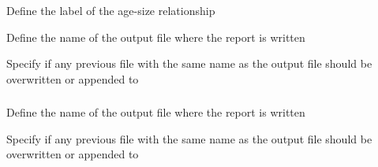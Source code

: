 \subsubsection[Print mean weight at age]{}

 {Define the label of the age-size relationship}

 {Define the name of the output file where the report is written}

 {Specify if any previous file with the same name as the output file should be overwritten or appended to}

\subsubsection[Printing the results of an MCMC]{}

 {Define the name of the output file where the report is written}

 {Specify if any previous file with the same name as the output file should be overwritten or appended to}
